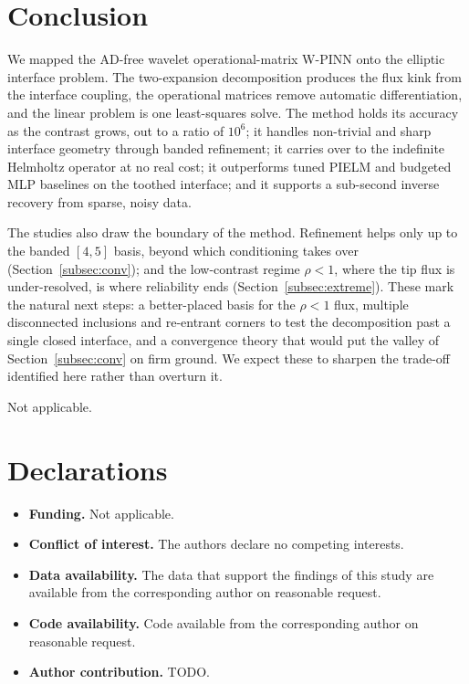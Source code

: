 \documentclass[pdflatex,sn-mathphys-num]{sn-jnl}%
\theoremstyle{thmstyleone}%
\theoremstyle{thmstyletwo}%
\theoremstyle{thmstylethree}%
\begin{document}
\section{Conclusion}\label{sec:conclusion}

We mapped the AD-free wavelet operational-matrix W-PINN onto the elliptic interface problem. The two-expansion decomposition produces the flux kink from the interface coupling, the operational matrices remove automatic differentiation, and the linear problem is one least-squares solve. The method holds its accuracy as the contrast grows, out to a ratio of $10^6$; it handles non-trivial and sharp interface geometry through banded refinement; it carries over to the indefinite Helmholtz operator at no real cost; it outperforms tuned PIELM and budgeted MLP baselines on the toothed interface; and it supports a sub-second inverse recovery from sparse, noisy data.

The studies also draw the boundary of the method. Refinement helps only up to the banded $[4,5]$ basis, beyond which conditioning takes over (Section~\ref{subsec:conv}); and the low-contrast regime $\rho<1$, where the tip flux is under-resolved, is where reliability ends (Section~\ref{subsec:extreme}). These mark the natural next steps: a better-placed basis for the $\rho<1$ flux, multiple disconnected inclusions and re-entrant corners to test the decomposition past a single closed interface, and a convergence theory that would put the valley of Section~\ref{subsec:conv} on firm ground. We expect these to sharpen the trade-off identified here rather than overturn it.

\backmatter

Not applicable.

\section*{Declarations}

\begin{itemize}
\item \textbf{Funding.} Not applicable.
\item \textbf{Conflict of interest.} The authors declare no competing interests.
\item \textbf{Data availability.} The data that support the findings of this study are available from the corresponding author on reasonable request.
\item \textbf{Code availability.} Code available from the corresponding author on reasonable request.
\item \textbf{Author contribution.} TODO.
\end{itemize}
\end{document}
